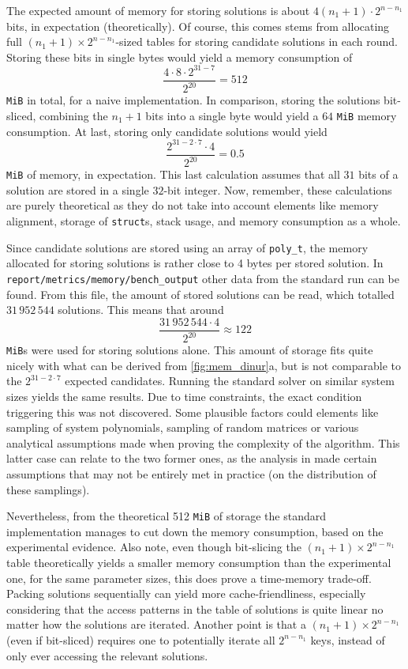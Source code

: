 The expected amount of memory for storing solutions is about $4(n_1 + 1) \cdot 2^{n - n_1}$ bits, in expectation (theoretically). Of course, this comes stems from allocating full $(n_1 + 1) \times 2^{n - n_1}$-sized tables for storing candidate solutions in each round. Storing these bits in single bytes would yield a memory consumption of 
$$
    \frac{4 \cdot 8 \cdot 2^{31 - 7}}{2^{20}} = 512
$$
\texttt{MiB} in total, for a naive implementation. In comparison, storing the solutions bit-sliced, combining the $n_1 + 1$ bits into a single byte would yield a $64$ \texttt{MiB} memory consumption. At last, storing only candidate solutions would yield
$$
    \frac{2^{31 - 2 \cdot 7} \cdot 4}{2^{20}} = 0.5
$$
\texttt{MiB} of memory, in expectation. This last calculation assumes that all $31$ bits of a solution are stored in a single $32$-bit integer. Now, remember, these calculations are purely theoretical as they do not take into account elements like memory alignment, storage of \texttt{struct}s, stack usage, and memory consumption as a whole.

Since candidate solutions are stored using an array of \texttt{poly\_t}, the memory allocated for storing solutions is rather close to 4 bytes per stored solution. In \texttt{report/metrics/memory/bench\_output} other data from the standard run can be found. From this file, the amount of stored solutions can be read, which totalled $31\,952\,544$ solutions. This means that around
$$
    \frac{31\,952\,544 \cdot 4}{2^{20}} \approx 122
$$
\texttt{MiB}s were used for storing solutions alone. This amount of storage fits quite nicely with what can be derived from \cref{fig:mem_dinur}a, but is not comparable to the $2^{31 - 2 \cdot 7}$ expected candidates. Running the standard solver on similar system sizes yields the same results. Due to time constraints, the exact condition triggering this was not discovered. Some plausible factors could elements like sampling of system polynomials, sampling of random matrices or various analytical assumptions made when proving the complexity of the algorithm. This latter case can relate to the two former ones, as the analysis in \cite{eurocrypt-2021-30841} made certain assumptions that may not be entirely met in practice (on the distribution of these samplings).

Nevertheless, from the theoretical 512 \texttt{MiB} of storage the standard implementation manages to cut down the memory consumption, based on the experimental evidence. Also note, even though bit-slicing the $(n_1 + 1) \times 2^{n - n_1}$ table theoretically yields a smaller memory consumption than the experimental one, for the same parameter sizes, this does prove a time-memory trade-off. Packing solutions sequentially can yield more cache-friendliness, especially considering that the access patterns in the table of solutions is quite linear no matter how the solutions are iterated. Another point is that a $(n_1 + 1) \times 2^{n - n_1}$ (even if bit-sliced) requires one to potentially iterate all $2^{n - n_1}$ keys, instead of only ever accessing the relevant solutions.


